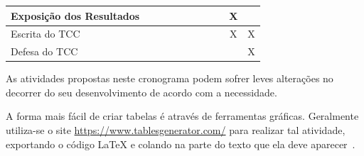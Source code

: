 \begin{table}[!htb]
\begin{tabular}{|l|c|c|c|c|c|c|c|c|c|c|}
Exposição dos Resultados                   &              &              &              &              &              &                &                   &               & X            &              \\ \hline
Escrita do TCC                             &              &              &              &              &              &                &                   &               & X            & X            \\ \hline
Defesa do TCC                              &              &              &              &              &              &                &                   &               &              & X            \\ \hline
\end{tabular}
\vspace{6pt}
\end{table}

As atividades propostas neste cronograma podem sofrer leves alterações no decorrer do seu desenvolvimento de acordo com a necessidade.

A forma mais fácil de criar tabelas é através de ferramentas gráficas. Geralmente utiliza-se o site \url{https://www.tablesgenerator.com/} para realizar tal atividade, exportando o código LaTeX e colando na parte do texto que ela deve aparecer~\cite{tablegenerator2021}.